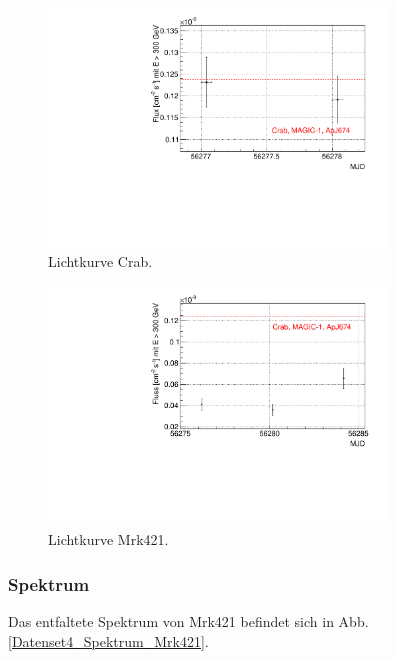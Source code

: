 \begin{figure}
    \centering
    \includegraphics[width=0.8\textwidth]{./Plots/04_MrkAnalyse/Datenset4/Datenset4_LC_Crab.pdf}
    \caption{Lichtkurve Crab.}
    \label{Datenset4_LC_Crab}
\end{figure}

\begin{figure}
    \centering
    \includegraphics[width=0.8\textwidth]{./Plots/04_MrkAnalyse/Datenset4/Datenset4_LC_Mrk421.pdf}
    \caption{Lichtkurve Mrk421.}
    \label{Datenset4_LC_Mrk421}
\end{figure}


\subsubsection{Spektrum}
Das entfaltete Spektrum von Mrk421 befindet sich in Abb.\ref{Datenset4_Spektrum_Mrk421}.

